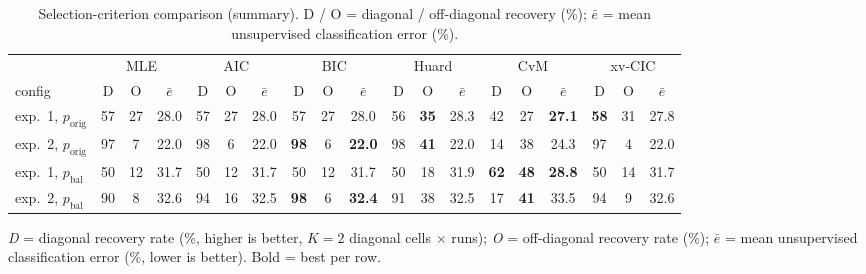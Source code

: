 \begin{table}[htbp]
  \centering
  \caption{Selection-criterion comparison (summary). D / O = diagonal / off-diagonal recovery (\%); $\bar{e}$ = mean unsupervised classification error (\%).}
  \label{tab:exp4-summary}
  \footnotesize
  \begin{tabular}{l ccc ccc ccc ccc ccc ccc }
    \toprule
    & \multicolumn{3}{c}{MLE} & \multicolumn{3}{c}{AIC} & \multicolumn{3}{c}{BIC} & \multicolumn{3}{c}{Huard} & \multicolumn{3}{c}{CvM} & \multicolumn{3}{c}{xv-CIC} \\
    \cmidrule(lr){2-4}\cmidrule(lr){5-7}\cmidrule(lr){8-10}\cmidrule(lr){11-13}\cmidrule(lr){14-16}\cmidrule(lr){17-19}
    config  & D & O & $\bar{e}$ & D & O & $\bar{e}$ & D & O & $\bar{e}$ & D & O & $\bar{e}$ & D & O & $\bar{e}$ & D & O & $\bar{e}$ \\
    \midrule
    exp.\ 1, $p_{\text{orig}}$ & 57 & 27 & 28.0 & 57 & 27 & 28.0 & 57 & 27 & 28.0 & 56 & \textbf{35} & 28.3 & 42 & 27 & \textbf{27.1} & \textbf{58} & 31 & 27.8 \\
    exp.\ 2, $p_{\text{orig}}$ & 97 & 7 & 22.0 & 98 & 6 & 22.0 & \textbf{98} & 6 & \textbf{22.0} & 98 & \textbf{41} & 22.0 & 14 & 38 & 24.3 & 97 & 4 & 22.0 \\
    exp.\ 1, $p_{\text{bal}}$ & 50 & 12 & 31.7 & 50 & 12 & 31.7 & 50 & 12 & 31.7 & 50 & 18 & 31.9 & \textbf{62} & \textbf{48} & \textbf{28.8} & 50 & 14 & 31.7 \\
    exp.\ 2, $p_{\text{bal}}$ & 90 & 8 & 32.6 & 94 & 16 & 32.5 & \textbf{98} & 6 & \textbf{32.4} & 91 & 38 & 32.5 & 17 & \textbf{41} & 33.5 & 94 & 9 & 32.6 \\
    \bottomrule
  \end{tabular}
  \par\smallskip
  \emph{D} = diagonal recovery rate (\%, higher is better, $K{=}2$ diagonal cells $\times$ runs); \emph{O} = off-diagonal recovery rate (\%); $\bar{e}$ = mean unsupervised classification error (\%, lower is better). Bold = best per row.
\end{table}
